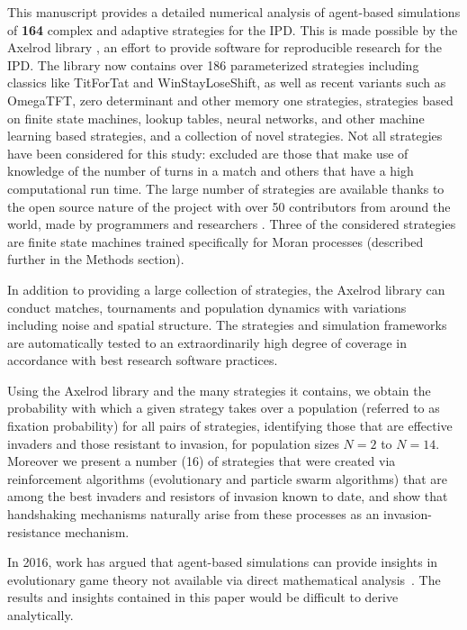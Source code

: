 \documentclass[10pt,letterpaper]{article}
\begin{document}
This manuscript provides a detailed numerical analysis of agent-based simulations
of \textbf{164} complex and adaptive strategies for the
IPD\@. This is made possible by the Axelrod library \cite{axelrodproject}, an
effort to provide software for reproducible research for the IPD\@. The library
now contains over 186 parameterized
strategies including classics like TitForTat and WinStayLoseShift, as well as
recent variants such as OmegaTFT, zero determinant and other memory one
strategies, strategies based on finite state machines, lookup tables, neural
networks, and other machine learning based strategies, and a collection of novel
strategies. Not all strategies have been considered for this study: excluded
are those that make use of knowledge of the number of turns in a match
and others that have a high
computational run time. The large number of strategies are available thanks to
the open source nature of the project with over 50 contributors from around the
world, made by programmers and researchers \cite{Knight2016}. Three of the considered
strategies are finite state machines trained specifically for Moran processes
(described further in the Methods section).

In addition to providing a large collection of strategies, the Axelrod library
can conduct matches, tournaments and population
dynamics with variations including noise and spatial structure.
The strategies and simulation frameworks are
automatically tested to an extraordinarily high degree of coverage in accordance
with best research software practices.

Using the Axelrod library and the many strategies it contains, we obtain the
probability with which a given strategy takes over a population (referred to as
fixation probability) for all pairs of strategies, identifying those that are
effective invaders and those resistant to invasion, for population sizes $N=2$
to $N=14$. Moreover we present a number (16) of strategies that were created via
reinforcement algorithms (evolutionary and particle swarm algorithms) that are
among the best invaders and resistors of invasion known to date, and show that
handshaking mechanisms naturally arise from these processes as an
invasion-resistance mechanism.

In 2016, work has argued that agent-based
simulations can provide insights in evolutionary game theory not available
via direct mathematical analysis~\cite{adami2016evolutionary}. The results
and insights contained in this paper would be difficult to derive analytically.
\end{document}
